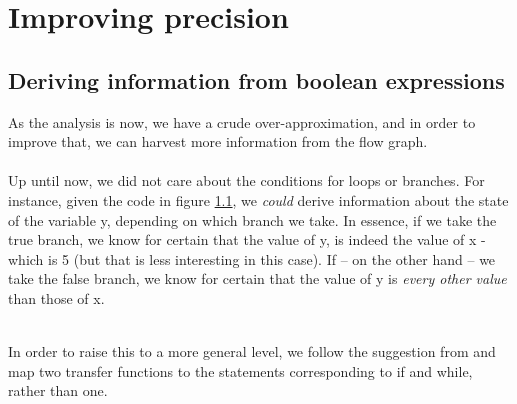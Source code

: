 
\chapter{Improving precision}
\section{Deriving information from boolean expressions}
As the analysis is now, we have a crude over-approximation, and in order to improve that, we can harvest more information from the flow graph.\\\\
Up until now, we did not care about the conditions for loops or branches. For instance, given the code in figure \ref{fig:if_flow_example}, we \emph{could} derive information about the state of the variable y, depending on which branch we take. In essence, if we take the true branch, we know for certain that the value of y, is indeed the value of x - which is 5 (but that is less interesting in this case). If -- on the other hand -- we take the false branch, we know for certain that the value of y is \emph{every other value} than those of x.\\\\
\begin{figure}[h]
\centering
{}
 \caption{}
 \label{fig:if_flow_example}
\end{figure} In order to raise this to a more general level, we follow the suggestion from \cite{02242_slides} and map two transfer functions to the statements corresponding to if and while, rather than one.


